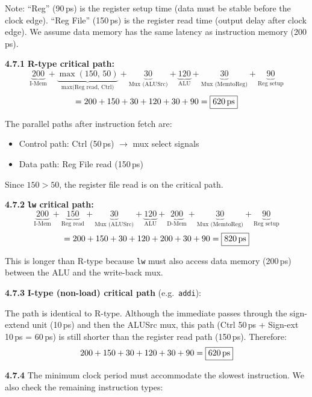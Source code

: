 \noindent Note: ``Reg'' (90\,ps) is the register setup time (data must be
stable before the clock edge).  ``Reg File'' (150\,ps) is the register read
time (output delay after clock edge).  We assume data memory has the same
latency as instruction memory (200\,ps).

\medskip\noindent\textbf{4.7.1}
\textbf{R-type critical path:}
\[
  \underbrace{200}_{\text{I-Mem}} +
  \underbrace{\max(150,\,50)}_{\text{max(Reg read, Ctrl)}} +
  \underbrace{30}_{\text{Mux (ALUSrc)}} +
  \underbrace{120}_{\text{ALU}} +
  \underbrace{30}_{\text{Mux (MemtoReg)}} +
  \underbrace{90}_{\text{Reg setup}}
\]
\[
  = 200 + 150 + 30 + 120 + 30 + 90 = \boxed{620\text{\,ps}}
\]

The parallel paths after instruction fetch are:
\begin{itemize}
  \item Control path: Ctrl (50\,ps) $\to$ mux select signals
  \item Data path: Reg File read (150\,ps)
\end{itemize}
Since $150 > 50$, the register file read is on the critical path.

\medskip\noindent\textbf{4.7.2}
\textbf{\texttt{lw} critical path:}
\[
  \underbrace{200}_{\text{I-Mem}} +
  \underbrace{150}_{\text{Reg read}} +
  \underbrace{30}_{\text{Mux (ALUSrc)}} +
  \underbrace{120}_{\text{ALU}} +
  \underbrace{200}_{\text{D-Mem}} +
  \underbrace{30}_{\text{Mux (MemtoReg)}} +
  \underbrace{90}_{\text{Reg setup}}
\]
\[
  = 200 + 150 + 30 + 120 + 200 + 30 + 90 = \boxed{820\text{\,ps}}
\]

This is longer than R-type because \texttt{lw} must also access data memory
(200\,ps) between the ALU and the write-back mux.

\medskip\noindent\textbf{4.7.3}
\textbf{I-type (non-load) critical path} (e.g.\ \texttt{addi}):

The path is identical to R-type.  Although the immediate passes through the
sign-extend unit (10\,ps) and then the ALUSrc mux, this path
(Ctrl 50\,ps + Sign-ext 10\,ps = 60\,ps) is still shorter than the register
read path (150\,ps).  Therefore:
\[
  200 + 150 + 30 + 120 + 30 + 90 = \boxed{620\text{\,ps}}
\]

\medskip\noindent\textbf{4.7.4}
The minimum clock period must accommodate the slowest instruction.  We also
check the remaining instruction types:

